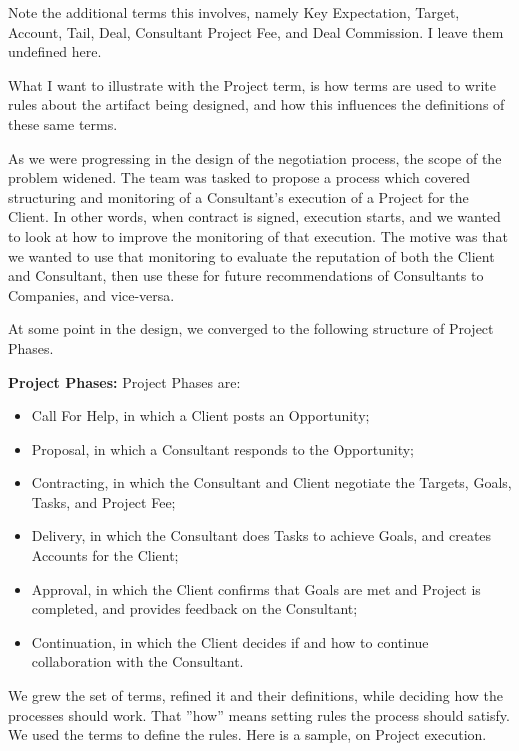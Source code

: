 \documentclass[graybox,envcountchap,sectrefs]{svmono}
\begin{document}
Note the additional terms this involves, namely Key Expectation, Target, Account, Tail, Deal, Consultant Project Fee, and Deal Commission. I leave them undefined here.

What I want to illustrate with the Project term, is how terms are used to write rules about the artifact being designed, and how this influences the definitions of these same terms.

As we were progressing in the design of the negotiation process, the scope of the problem widened. The team was tasked to propose a process which covered structuring and monitoring of a Consultant's execution of a Project for the Client. In other words, when contract is signed, execution starts, and we wanted to look at how to improve the monitoring of that execution. The motive was that we wanted to use that monitoring to evaluate the reputation of both the Client and Consultant, then use these for future recommendations of Consultants to Companies, and vice-versa.

At some point in the design, we converged to the following structure of Project Phases.

\begin{svgraybox}
\textbf{Project Phases:} Project Phases are:
\begin{itemize}
\item Call For Help, in which a Client posts an Opportunity;
\item Proposal, in which a Consultant responds to the Opportunity;
\item Contracting, in which the Consultant and Client negotiate the Targets, Goals, Tasks, and Project Fee;
\item Delivery, in which the Consultant does Tasks to achieve Goals, and creates Accounts for the Client;
\item Approval, in which the Client confirms that Goals are met and Project is completed, and provides feedback on the Consultant;
\item Continuation, in which the Client decides if and how to continue collaboration with the Consultant.
\end{itemize}
\end{svgraybox}

We grew the set of terms, refined it and their definitions, while deciding how the processes should work. That ''how'' means setting rules the process should satisfy. We used the terms to define the rules. Here is a sample, on Project execution.
\end{document}
